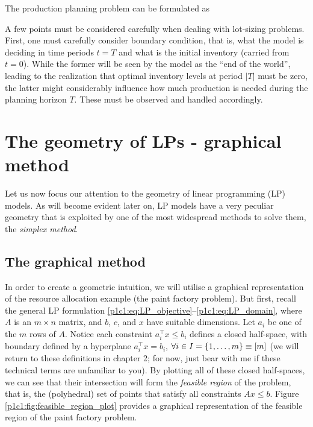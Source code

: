 The production planning problem can be formulated as
%
%

A few points must be considered carefully when dealing with lot-sizing problems. First, one must carefully consider boundary condition, that is, what the model is deciding in time periods $t = T$ and what is the initial inventory (carried from $t=0$). While the former will be seen by the model as the ``end of the world'', leading to the realization that optimal inventory levels at period $|T|$ must be zero, the latter might considerably influence how much production is needed during the planning horizon $T$. These must be observed and handled accordingly. 
 


\section{The geometry of LPs - graphical method} 

Let us now focus our attention to the geometry of linear programming (LP) models. As will become evident later on, LP models have a very peculiar geometry that is exploited by one of the most widespread methods to solve them, the \emph{simplex method}. 

\subsection{The graphical method}

In order to create a geometric intuition, we will utilise a graphical representation of the resource allocation example (the paint factory problem). But first, recall the general LP formulation \eqref{p1c1:eq:LP_objective}--\eqref{p1c1:eq:LP_domain}, where $A$ is an $m \times n$ matrix, and $b$, $c$, and $x$ have suitable dimensions. Let $a_i$ be one of the $m$ rows of $A$. Notice each constraint $a_i^\top x \leq b_i$ defines a closed half-space, with boundary defined by a hyperplane $a_i^\top x= b_i$, $\forall i \in I = \left\{ 1,\dots,m \right \} \equiv [m]$ (we will return to these definitions in chapter 2; for now, just bear with me if these technical terms are unfamiliar to you). By plotting all of these closed half-spaces, we can see that their intersection will form the \emph{feasible region} of the problem, that is, the (polyhedral) set of points that satisfy all constraints $Ax \le b$. Figure \ref{p1c1:fig:feasible_region_plot} provides a graphical representation of the feasible region of the paint factory problem. 

